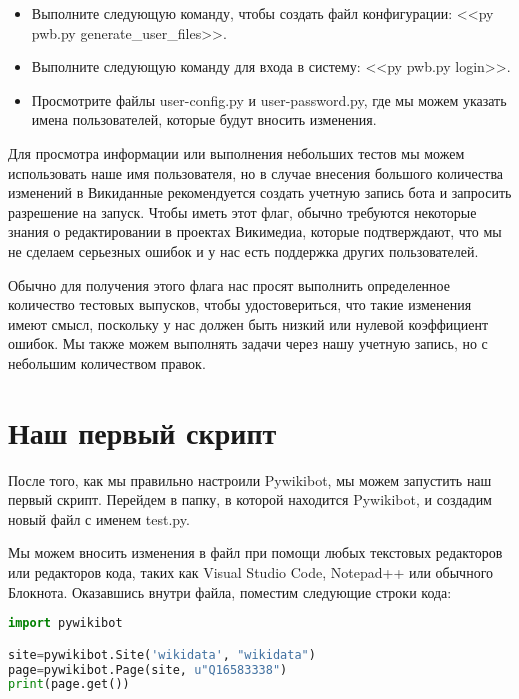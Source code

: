\begin{itemize}
  \setlength{\itemindent}{2em}
  \item Выполните следующую команду, чтобы создать файл конфигурации: <<py pwb.py generate\_user\_files>>.
  \item Выполните следующую команду для входа в систему: <<py pwb.py login>>.
  \item Просмотрите файлы user-config.py и user-password.py, где мы можем указать имена пользователей, которые будут вносить изменения.
\end{itemize}

Для просмотра информации или выполнения небольших тестов мы можем использовать наше имя пользователя, но в случае внесения большого количества изменений в Викиданные рекомендуется создать учетную запись бота и запросить разрешение на запуск. Чтобы иметь этот флаг, обычно требуются некоторые знания о редактировании в проектах Викимедиа, которые подтверждают, что мы не сделаем серьезных ошибок и у нас есть поддержка других пользователей.

Обычно для получения этого флага нас просят выполнить определенное количество тестовых выпусков, чтобы удостовериться, что такие изменения имеют смысл, поскольку у нас должен быть низкий или нулевой коэффициент ошибок. Мы также можем выполнять задачи через нашу учетную запись, но с небольшим количеством правок.

\section{Наш первый скрипт}
\label{sec:firstScript}
После того, как мы правильно настроили Pywikibot, мы можем запустить наш первый скрипт. Перейдем в папку, в которой находится Pywikibot, и создадим новый файл с именем test.py.

Мы можем вносить изменения в файл при помощи любых текстовых редакторов или редакторов кода, таких как Visual Studio Code, Notepad++ или обычного Блокнота. Оказавшись внутри файла, поместим следующие строки кода:

\lstset{style=mystyle}
\begin{lstlisting}[language=Python]
import pywikibot

site=pywikibot.Site('wikidata', "wikidata")
page=pywikibot.Page(site, u"Q16583338")
print(page.get())
\end{lstlisting}

